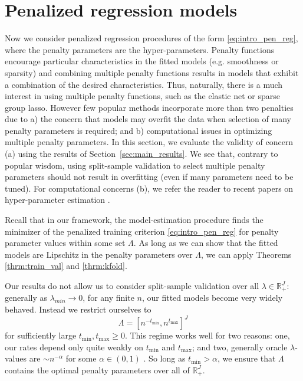 \documentclass[12pt]{article}
\begin{document}
\section{Penalized regression models}
\label{sec:examples}
Now we consider penalized regression procedures of the form \eqref{eq:intro_pen_reg}, where the penalty parameters are the hyper-parameters.
Penalty functions encourage particular characteristics in the fitted models (e.g. smoothness or sparsity) and combining multiple penalty functions results in models that exhibit a combination of the desired characteristics. 
Thus, naturally, there is a much interest in using multiple penalty functions, such as the elastic net or sparse group lasso.
However few popular methods incorporate more than two penalties due to a) the concern that models may overfit the data when selection of many penalty parameters is required; and b) computational issues in optimizing multiple penalty parameters. In this section, we evaluate the validity of concern (a) using the results of Section~\ref{sec:main_results}. We see that, contrary to popular wisdom, using split-sample validation to select multiple penalty parameters should not result in overfitting (even if many parameters need to be tuned). For computational concerns (b), we refer the reader to recent papers on hyper-parameter estimation \citep{bengio2000gradient, foo2008efficient, snoek2012practical}.

Recall that in our framework, the model-estimation procedure finds the minimizer of the penalized training criterion \eqref{eq:intro_pen_reg} for penalty parameter values within some set $\Lambda$. As long as we can show that the fitted models are Lipschitz in the penalty parameters over $\Lambda$, we can apply Theorems \ref{thrm:train_val} and \ref{thrm:kfold}.

Our results do not allow us to consider split-sample validation over all $\lambda\in\mathbb{R}^J_+$: generally as $\lambda_{min} \rightarrow 0$, for any finite $n$, our fitted models become very widely behaved. Instead we restrict ourselves to 
\begin{equation}
\label{thrm:lambda_range}
\Lambda = [ n^{-t_{\min}}, n^{t_{\max}}]^J
\end{equation}
for sufficiently large $t_{\min}, t_{\max} \ge 0$. This regime works well for two reasons: one, our rates depend only quite weakly on $t_{\min}$ and $t_{\max}$; and two, generally oracle $\lambda$-values are $\sim n^{-\alpha}$ for some $\alpha \in (0,1)$ \citep{van2000empirical, van2014additive, buhlmann2011statistics}. So long as $t_{\min} > \alpha$, we ensure that $\Lambda$ contains the optimal penalty parameters over all of $\mathbb{R}^J_+$.
\end{document}
